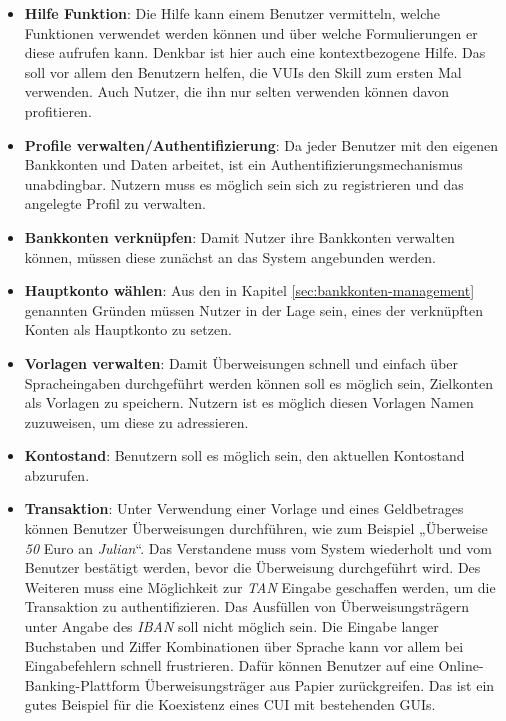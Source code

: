 \begin{itemize}
    \item\textbf{Hilfe Funktion}: Die Hilfe kann einem Benutzer vermitteln, welche Funktionen verwendet werden können und über welche Formulierungen er diese aufrufen kann. Denkbar ist hier auch eine kontextbezogene Hilfe. Das soll vor allem den Benutzern helfen, die \acp{VUI} \bzw den Skill zum ersten Mal verwenden. Auch Nutzer, die ihn nur selten verwenden können davon profitieren.
    
    \item\textbf{Profile verwalten/Authentifizierung}: Da jeder Benutzer mit den eigenen Bankkonten und Daten arbeitet, ist ein Authentifizierungsmechanismus unabdingbar. Nutzern muss es möglich sein sich zu registrieren und das angelegte Profil zu verwalten.
    
    \item\textbf{Bankkonten verknüpfen}: Damit Nutzer ihre Bankkonten verwalten können, müssen diese zunächst an das System angebunden werden.
    
    \item\textbf{Hauptkonto wählen}: Aus den in Kapitel \ref{sec:bankkonten-management} genannten Gründen müssen Nutzer in der Lage sein, eines der verknüpften Konten als Hauptkonto zu setzen. 
    
    \item\textbf{Vorlagen verwalten}: Damit Überweisungen schnell und einfach über Spracheingaben durchgeführt werden können soll es möglich sein, Zielkonten als Vorlagen zu speichern. Nutzern ist es möglich diesen Vorlagen Namen zuzuweisen, um diese zu adressieren. 
    
    \item\textbf{Kontostand}: Benutzern soll es möglich sein, den aktuellen Kontostand abzurufen.
    
    \item\textbf{Transaktion}: Unter Verwendung einer Vorlage und eines Geldbetrages können Benutzer Überweisungen durchführen, wie zum Beispiel „Überweise \textit{50} Euro an \textit{Julian}“. Das Verstandene muss vom System wiederholt und vom Benutzer bestätigt werden, bevor die Überweisung durchgeführt wird. Des Weiteren muss eine Möglichkeit zur \textit{\ac{TAN}} Eingabe geschaffen werden, um die Transaktion zu authentifizieren. Das Ausfüllen von Überweisungsträgern unter Angabe des \textit{\ac{IBAN}} soll nicht möglich sein. Die Eingabe langer Buchstaben und Ziffer Kombinationen über Sprache kann vor allem bei Eingabefehlern schnell frustrieren. Dafür können Benutzer auf eine Online-Banking-Plattform \bzw Überweisungsträger aus Papier zurückgreifen. Das ist ein gutes Beispiel für die Koexistenz eines \ac{CUI} mit bestehenden \acp{GUI}.
    

\end{itemize}
